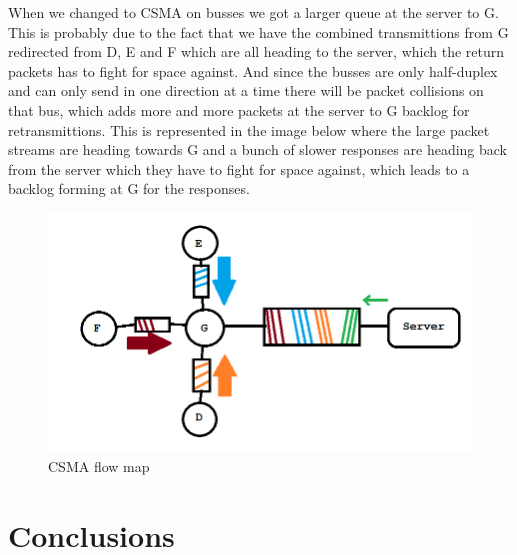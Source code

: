 \documentclass{article}
\begin{document}
When we changed to CSMA on busses we got a larger queue at the server to G. This is probably due
to the fact that we have the combined transmittions from G redirected from D, E and F which are 
all heading to the server, which the return packets has to fight for space against. And since the
busses are only half-duplex and can only send in one direction at a time there will be packet 
collisions on that bus, which adds more and more packets at the server to G backlog for retransmittions.
This is represented in the image below where the large packet streams are heading towards G and a bunch 
of slower responses are heading back from the server which they have to fight for space against, which 
leads to a backlog forming at G for the responses.
\begin{figure}[h!]
  \includegraphics[width=\linewidth]{csmamap.png}
  \caption{CSMA flow map}
  \label{fig:csma}
\end{figure}

\section{Conclusions}
\end{document}
